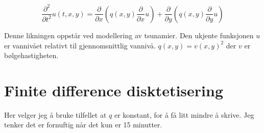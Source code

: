 \documentclass[a4paper, 10pt]{article}
\newcommand{\p}{\partial}
\begin{document}
\begin{equation}
	\frac{\p^2}{\p t^2} u(t, x, y) = \frac{\p}{\p x} \left(q(x, y) \frac{\p}{\p x} u\right) + \frac{\p}{\p y} \left(q(x, y) \frac{\p}{\p y} u\right)
\end{equation}

Denne likningen oppstår ved modellering av tsunamier. Den ukjente funksjonen $u$ er vannivået relativt til gjennomsnittlig vannivå. $q(x, y) = v(x, y)^2$ der $v$ er bølgehastigheten. 


\section{Finite difference disktetisering}

Her velger jeg å bruke tilfellet at $q$ er konstant, for å få litt mindre å skrive. Jeg tenker det er fornuftig når det kun er 15 minutter. 
\end{document}
